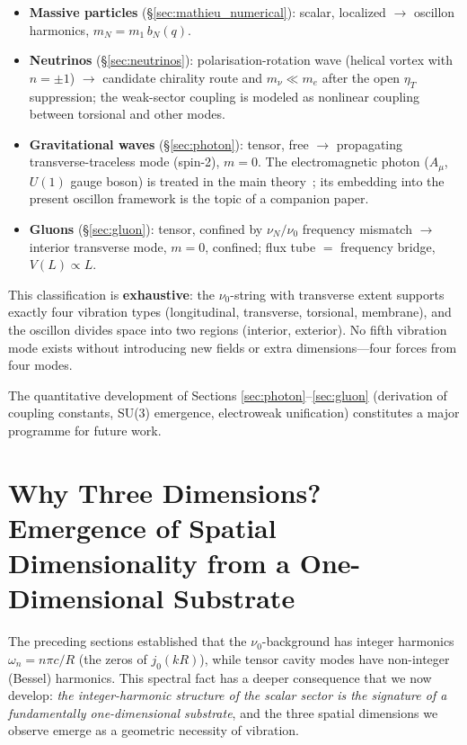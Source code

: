\documentclass[11pt]{article}
\begin{document}
\begin{itemize}
  \item \textbf{Massive particles}
    (\S\ref{sec:mathieu_numerical}):
    scalar, localized $\to$ oscillon harmonics,
    $m_N = m_1\,b_N(q)$.
  \item \textbf{Neutrinos}
    (\S\ref{sec:neutrinos}):
    polarisation-rotation wave (helical vortex
    with $n = \pm 1$)
    $\to$ candidate chirality route and
    $m_\nu \ll m_e$ after the open $\eta_T$
    suppression; the weak-sector coupling is
    modeled as nonlinear coupling between
    torsional and other modes.
  \item \textbf{Gravitational waves}
    (\S\ref{sec:photon}):
    tensor, free $\to$ propagating
    transverse-traceless mode (spin-2), $m = 0$.
    The electromagnetic photon ($A_\mu$,
    $U(1)$ gauge boson) is treated in the main
    theory~\cite{Lotishvili2026}; its embedding
    into the present oscillon framework is the
    topic of a companion paper.
  \item \textbf{Gluons}
    (\S\ref{sec:gluon}):
    tensor, confined by $\nu_N / \nu_0$ frequency
    mismatch $\to$ interior transverse mode,
    $m = 0$, confined; flux tube $=$ frequency
    bridge, $V(L) \propto L$.
\end{itemize}

This classification is \textbf{exhaustive}:
the $\nu_0$-string with transverse extent
supports exactly four vibration types
(longitudinal, transverse, torsional, membrane),
and the oscillon divides space into two regions
(interior, exterior).  No fifth vibration mode
exists without introducing new fields or extra
dimensions---four forces from four modes.

The quantitative development of Sections
\ref{sec:photon}--\ref{sec:gluon} (derivation
of coupling constants, SU(3) emergence,
electroweak unification) constitutes a major
programme for future work.

\section{Why Three Dimensions?  Emergence of
Spatial Dimensionality from a One-Dimensional
Substrate}
\label{sec:dimensions}

The preceding sections established that the
$\nu_0$-background has integer harmonics
$\omega_n = n\pi c/R$ (the zeros of
$j_0(kR)$), while tensor cavity modes have
non-integer (Bessel) harmonics.
This spectral fact has a deeper consequence
that we now develop: \emph{the integer-harmonic
structure of the scalar sector is the signature
of a fundamentally one-dimensional substrate},
and the three spatial dimensions we observe
emerge as a geometric necessity of vibration.
\end{document}

